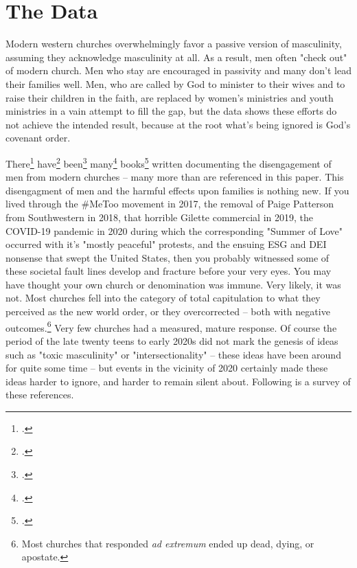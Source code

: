 \documentclass[justified, nobib]{tufte-handout}
\begin{document}
\ifdefined\embedversion\newpage\fi
\section{The Data}
Modern western churches overwhelmingly favor a passive version of masculinity, assuming they acknowledge masculinity at all.  As a result, men often "check out" of modern church.  Men who stay are encouraged in passivity and many don't lead their families well.  Men, who are called by God to minister to their wives and to raise their children in the faith, are replaced by women's ministries and youth ministries in a vain attempt to fill the gap, but the data shows these efforts do not achieve the intended result, because at the root what's being ignored is God's covenant order.

There\footcite{murrowmen} have\footcite{bauchamdriven} been\footcite{hamgone} many\footcite{coughlinnice} books\footcite{fosterman} written documenting the disengagement of men from modern churches -- many more than are referenced in this paper.  This disengagment of men and the harmful effects upon families is nothing new.  If you lived through the \#MeToo movement in 2017, the removal of Paige Patterson from Southwestern in 2018, that horrible Gilette commercial in 2019, the COVID-19 pandemic in 2020 during which the corresponding "Summer of Love" occurred with it's "mostly peaceful" protests, and the ensuing ESG and DEI nonsense that swept the United States, then you probably witnessed some of these societal fault lines develop and fracture before your very eyes.  You may have thought your own church or denomination was immune.  Very likely, it was not.  Most churches fell into the category of total capitulation to what they perceived as the new world order, or they overcorrected -- both with negative outcomes.\footnote{Most churches that responded \textit{ad extremum} ended up dead, dying, or apostate.} Very few churches had a measured, mature response.  Of course the period of the late twenty teens to early 2020s did not mark the genesis of ideas such as "toxic masculinity" or "intersectionality" -- these ideas have been around for quite some time -- but events in the vicinity of 2020 certainly made these ideas harder to ignore, and harder to remain silent about.  Following is a survey of these references.
\end{document}
